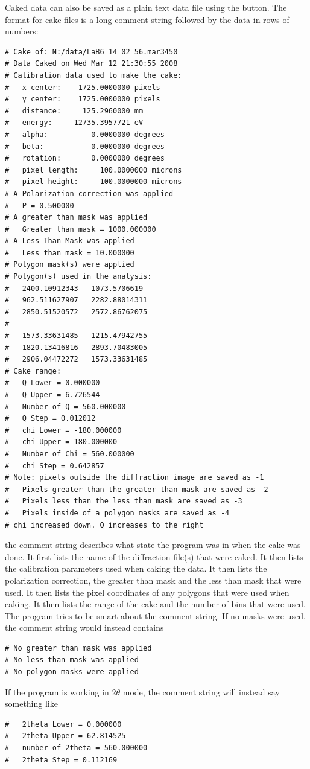 Caked data can also be saved as a plain text data file
using the  button. The format for cake files is 
a long comment string followed by the data in rows of numbers:
\begin{lstlisting}[caption={'caked\_data.dat'}]
# Cake of: N:/data/LaB6_14_02_56.mar3450 
# Data Caked on Wed Mar 12 21:30:55 2008
# Calibration data used to make the cake:
#   x center:    1725.0000000 pixels
#   y center:    1725.0000000 pixels
#   distance:     125.2960000 mm
#   energy:     12735.3957721 eV
#   alpha:          0.0000000 degrees
#   beta:           0.0000000 degrees
#   rotation:       0.0000000 degrees
#   pixel length:     100.0000000 microns
#   pixel height:     100.0000000 microns
# A Polarization correction was applied
#   P = 0.500000
# A greater than mask was applied
#   Greater than mask = 1000.000000
# A Less Than Mask was applied
#   Less than mask = 10.000000
# Polygon mask(s) were applied
# Polygon(s) used in the analysis:
#   2400.10912343	1073.5706619
#   962.511627907	2282.88014311
#   2850.51520572	2572.86762075
#
#   1573.33631485	1215.47942755
#   1820.13416816	2893.70483005
#   2906.04472272	1573.33631485
# Cake range:
#   Q Lower = 0.000000
#   Q Upper = 6.726544
#   Number of Q = 560.000000
#   Q Step = 0.012012
#   chi Lower = -180.000000
#   chi Upper = 180.000000
#   Number of Chi = 560.000000
#   chi Step = 0.642857
# Note: pixels outside the diffraction image are saved as -1
#   Pixels greater than the greater than mask are saved as -2
#   Pixels less than the less than mask are saved as -3
#   Pixels inside of a polygon masks are saved as -4
# chi increased down. Q increases to the right
\end{lstlisting}
the comment string describes what state the program was in when the 
cake was done. It first lists the name of the diffraction 
file(s) that were caked. It then lists the calibration parameters 
used when caking the data. It then lists the polarization correction, 
the greater than mask and the less than mask that were used. It then lists 
the pixel 
coordinates of any polygons that were used when caking.  It then lists 
the range of the cake and the number of bins that were used.
The program tries to be smart about the comment string. If no 
masks were used, the comment string would instead contains 
\begin{lstlisting}[caption={'Alternate Header'}]
# No greater than mask was applied
# No less than mask was applied
# No polygon masks were applied
\end{lstlisting}
If the program is working in $2\theta$ mode, the comment string will 
instead say something like
\begin{lstlisting}[caption={'Another Alternate Header'}]
#   2theta Lower = 0.000000
#   2theta Upper = 62.814525
#   number of 2theta = 560.000000
#   2theta Step = 0.112169
\end{lstlisting}

